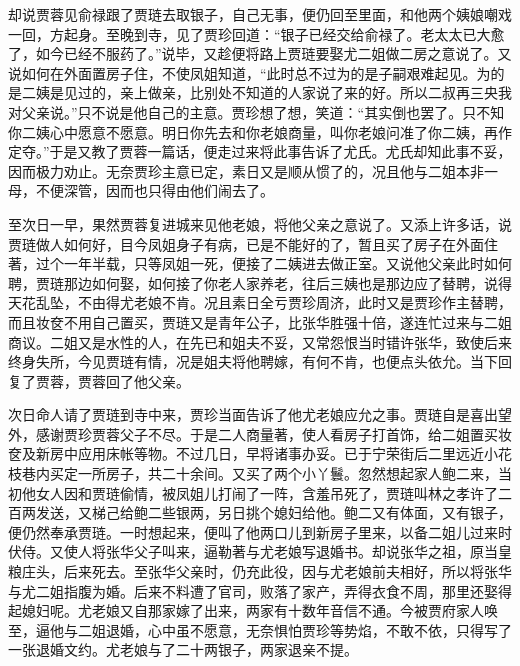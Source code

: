 \begin{parag}
    却说贾蓉见俞禄跟了贾琏去取银子，自己无事，便仍回至里面，和他两个姨娘嘲戏一回，方起身。至晚到寺，见了贾珍回道：“银子已经交给俞禄了。老太太已大愈了，如今已经不服药了。”说毕，又趁便将路上贾琏要娶尤二姐做二房之意说了。又说如何在外面置房子住，不使凤姐知道，“此时总不过为的是子嗣艰难起见。为的是二姨是见过的，亲上做亲，比别处不知道的人家说了来的好。所以二叔再三央我对父亲说。”只不说是他自己的主意。贾珍想了想，笑道：“其实倒也罢了。只不知你二姨心中愿意不愿意。明日你先去和你老娘商量，叫你老娘问准了你二姨，再作定夺。”于是又教了贾蓉一篇话，便走过来将此事告诉了尤氏。尤氏却知此事不妥，因而极力劝止。无奈贾珍主意已定，素日又是顺从惯了的，况且他与二姐本非一母，不便深管，因而也只得由他们闹去了。
\end{parag}


\begin{parag}
    至次日一早，果然贾蓉复进城来见他老娘，将他父亲之意说了。又添上许多话，说贾琏做人如何好，目今凤姐身子有病，已是不能好的了，暂且买了房子在外面住著，过个一年半载，只等凤姐一死，便接了二姨进去做正室。又说他父亲此时如何聘，贾琏那边如何娶，如何接了你老人家养老，往后三姨也是那边应了替聘，说得天花乱坠，不由得尤老娘不肯。况且素日全亏贾珍周济，此时又是贾珍作主替聘，而且妆奁不用自己置买，贾琏又是青年公子，比张华胜强十倍，遂连忙过来与二姐商议。二姐又是水性的人，在先已和姐夫不妥，又常怨恨当时错许张华，致使后来终身失所，今见贾琏有情，况是姐夫将他聘嫁，有何不肯，也便点头依允。当下回复了贾蓉，贾蓉回了他父亲。
\end{parag}


\begin{parag}
    次日命人请了贾琏到寺中来，贾珍当面告诉了他尤老娘应允之事。贾琏自是喜出望外，感谢贾珍贾蓉父子不尽。于是二人商量著，使人看房子打首饰，给二姐置买妆奁及新房中应用床帐等物。不过几日，早将诸事办妥。已于宁荣街后二里远近小花枝巷内买定一所房子，共二十余间。又买了两个小丫鬟。忽然想起家人鲍二来，当初他女人因和贾琏偷情，被凤姐儿打闹了一阵，含羞吊死了，贾琏叫林之孝许了二百两发送，又梯己给鲍二些银两，另日挑个媳妇给他。鲍二又有体面，又有银子，便仍然奉承贾琏。一时想起来，便叫了他两口儿到新房子里来，以备二姐儿过来时伏侍。又使人将张华父子叫来，逼勒著与尤老娘写退婚书。却说张华之祖，原当皇粮庄头，后来死去。至张华父亲时，仍充此役，因与尤老娘前夫相好，所以将张华与尤二姐指腹为婚。后来不料遭了官司，败落了家产，弄得衣食不周，那里还娶得起媳妇呢。尤老娘又自那家嫁了出来，两家有十数年音信不通。今被贾府家人唤至，逼他与二姐退婚，心中虽不愿意，无奈惧怕贾珍等势焰，不敢不依，只得写了一张退婚文约。尤老娘与了二十两银子，两家退亲不提。
\end{parag}


